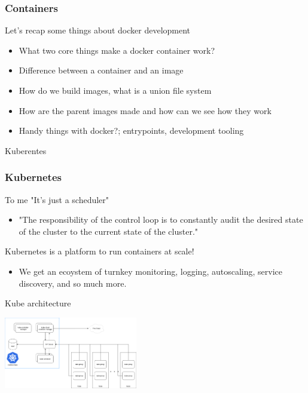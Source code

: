 \documentclass[11pt]{beamer}
\begin{document}
\begin{frame}
  \frametitle{Containers}
    Let's recap some things about docker development
  \begin{itemize}
    \item What two core things make a docker container work?
    \item Difference between a container and an image
    \item How do we build images, what is a union file system
    \item How are the parent images made and how can we see how they work
    \item Handy things with docker?; entrypoints, development tooling
  \end{itemize}
\end{frame}

\begin{frame}
  \begin{center}
    Kuberentes
  \end{center}
\end{frame}

\begin{frame}
  \frametitle{Kubernetes}
    To me "It's just a scheduler"
  \begin{itemize}
    \item "The responsibility of the control loop is to constantly audit the desired state of the cluster to the current state of the cluster."
  \end{itemize}
    Kubernetes is a platform to run containers at scale!
  \begin{itemize}
    \item We get an ecoystem of turnkey monitoring, logging, autoscaling, service discovery, and so much more.
  \end{itemize}
\end{frame}

\begin{frame}
  \begin{center}
    Kube architecture
  \end{center}
  \begin{center}
    \includegraphics[width=220px,keepaspectratio]{control-plane}
  \end{center}
\end{frame}
\end{document}
